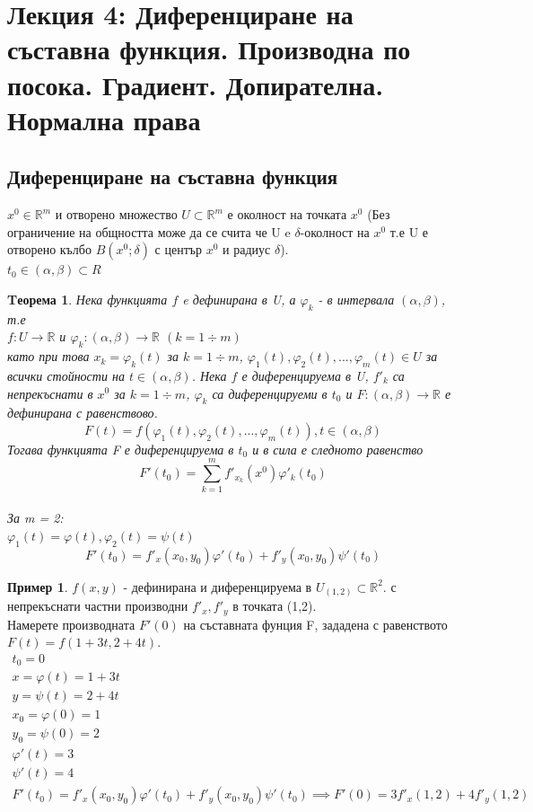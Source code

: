 \documentclass[a4paper,fleqn,12pt]{article}
\newtheorem{theorem}{Tеорема}[subsection]
\theoremstyle{definition}
\newtheorem{example}{Пример}[subsection]
\begin{document}
\newpage

\section{Лекция 4: Диференциране на съставна функция. Производна по посока. Градиент. Допирателна. Нормална права}

\subsection{Диференциране на съставна функция}
$x^0 \in \mathbb{R}^m$ и отворено множество $U \subset \mathbb{R}^m$ е околност на точката $x^0$ (Без ограничение на общността може да се счита че U e $\delta$-околност на $x^0$ т.е U е отворено кълбо $B(x^0;\delta)$ с център $x^0$ и радиус $\delta$). \\
$t_0 \in (\alpha, \beta) \subset R$

\begin{theorem}
Нека функцията $f$ e дефинирана в U, а $\varphi_k$ - в интервала $(\alpha, \beta)$, т.е \\
$f: U \to \mathbb{R}$ и $\varphi_k: (\alpha, \beta)  \to \mathbb{R} $ $ (k = 1 \div m)$\\
като при това $x_k = \varphi_k(t)$ за $ k = 1 \div m $, $ \varphi_1(t),  \varphi_2(t), ...,  \varphi_m(t) \in U$ за всички стойности на $t \in (\alpha, \beta)$. Нека $f$ е диференцируема в U, $f'_k$ са непрекъснати в $x^0$ за $ k = 1 \div m$, $\varphi_k$ са диференцируеми в $t_0$ и $F: (\alpha, \beta)  \to \mathbb{R}$ е дефинирана с равенствово. \\
$$F(t) = f(\varphi_1(t),  \varphi_2(t), ...,  \varphi_m(t)), t \in (\alpha, \beta)$$
Тогава функцията F е диференцируема в $t_0$ и в сила е следното равенство
$$F'(t_0) = \sum_{k =1}^m f'_{x_k}(x^0)\varphi '_k (t_0)$$ \\
За m = 2: \\
$\varphi_1(t) = \varphi(t) , \varphi_2(t) =\psi(t) $
$$F'(t_0) = f'_x(x_0, y_0)\varphi'(t_0) + f'_y(x_0, y_0)\psi'(t_0)$$
\end{theorem}

\begin{example}
$f(x,y)$ - дефинирана и диференцируема в $U_{(1,2)} \subset \mathbb{R}^2$. с непрекъснати частни производни $f'_x, f'_y$ в точката (1,2). \\
Намерете производната $F'(0)$ на съставната фунция F, зададена с равенството $F(t) = f(1+3t, 2+4t)$.
\begin{gather*}
t_0 = 0 \\
x = \varphi(t) = 1+3t \\
y = \psi(t) = 2 + 4t \\
x_0 = \varphi(0) = 1 \\
y_0 = \psi(0) = 2 \\
\varphi'(t) = 3 \\
\psi'(t) = 4 \\
F'(t_0) = f'_x(x_0, y_0)\varphi'(t_0) + f'_y(x_0, y_0)\psi'(t_0) \implies  F'(0) = 3f'_x(1,2) + 4f'_y(1,2)
\end{gather*}
\end{example}
\end{document}
